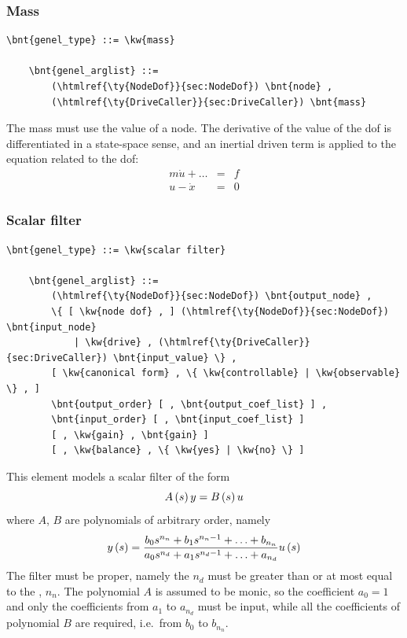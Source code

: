 \subsubsection{Mass}
\label{sec:EL:GENEL:MASS}
\begin{Verbatim}[commandchars=\\\{\}]
    \bnt{genel_type} ::= \kw{mass}

    \bnt{genel_arglist} ::=
        (\htmlref{\ty{NodeDof}}{sec:NodeDof}) \bnt{node} ,
        (\htmlref{\ty{DriveCaller}}{sec:DriveCaller}) \bnt{mass}
\end{Verbatim}
The mass must use the  value of a  node.
The derivative of the  value of
the dof is differentiated in a state-space sense, and an inertial driven
term is applied to the equation related to the dof:
\begin{eqnarray*}
        m\dot{u} + \ldots & = & f \\
	u - \dot{x} & = & 0
\end{eqnarray*}

\subsubsection{Scalar filter}
\label{sec:EL:GENEL:SCALAR-FILTER}
\begin{Verbatim}[commandchars=\\\{\}]
    \bnt{genel_type} ::= \kw{scalar filter}

    \bnt{genel_arglist} ::=
        (\htmlref{\ty{NodeDof}}{sec:NodeDof}) \bnt{output_node} ,
        \{ [ \kw{node dof} , ] (\htmlref{\ty{NodeDof}}{sec:NodeDof}) \bnt{input_node}
            | \kw{drive} , (\htmlref{\ty{DriveCaller}}{sec:DriveCaller}) \bnt{input_value} \} ,
        [ \kw{canonical form} , \{ \kw{controllable} | \kw{observable} \} , ]
        \bnt{output_order} [ , \bnt{output_coef_list} ] ,
        \bnt{input_order} [ , \bnt{input_coef_list} ]
        [ , \kw{gain} , \bnt{gain} ]
        [ , \kw{balance} , \{ \kw{yes} | \kw{no} \} ]
\end{Verbatim}
This element models a scalar filter of the form
\begin{displaymath}
    A\left( s \right)y = B\left( s \right)u
\end{displaymath}
where $ A $, $ B $ are polynomials of arbitrary order, namely
\begin{displaymath}
	y\left( s \right) = \frac{
		b_0 s^{n_n}
		+ b_1 s^{n_n-1}
		+ \ldots
		+ b_{n_n}
	}{
		a_0 s^{n_d}
		+ a_1 s^{n_d-1}
		+ \ldots
		+ a_{n_d}
	} u\left( s \right)
\end{displaymath}
The filter must be proper, namely the  $n_d$
must be greater than or at most equal to the , $n_n$.
The polynomial $ A $ is assumed to be monic, so the coefficient 
$a_0=1$ and only the coefficients from $a_1$ to $a_{n_d}$ must be input,
while all the coefficients of polynomial $ B $ are required,
i.e.\ from $b_0$ to $b_{n_n}$.

